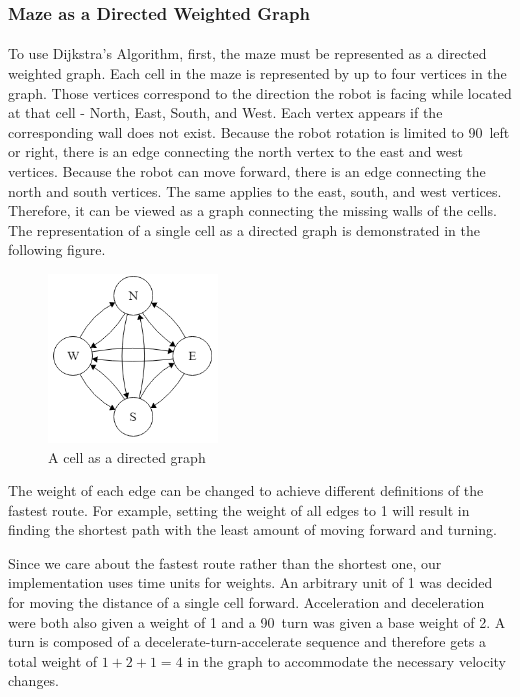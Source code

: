 \documentclass[12pt]{article}
\begin{document}
\subsubsection{Maze as a Directed Weighted Graph} \label{Maze as a Directed Weighted Graph}
\paragraph{}
To use Dijkstra's Algorithm, first, the \gls{maze} must be represented as a directed weighted \gls{graph}.
Each \gls{cell} in the \gls{maze} is represented by up to four vertices in the \gls{graph}.
Those vertices correspond to the direction the robot is facing while located at that \gls{cell} - North, East, South, and West.
Each vertex appears if the corresponding wall does not exist.
Because the robot rotation is limited to 90\textdegree\ left or right, there is an edge connecting the north vertex to the east and west vertices.
Because the robot can move forward, there is an edge connecting the north and south vertices.
The same applies to the east, south, and west vertices.
Therefore, it can be viewed as a \gls{graph} connecting the missing walls of the \gls{cell}s.
The representation of a single \gls{cell} as a directed \gls{graph} is demonstrated in the following figure.

\begin{figure}[H]
\centering
\includegraphics[width=0.4\textwidth]{images/cell_graph.png}
\caption{A \gls{cell} as a directed \gls{graph}}
\end{figure}

The weight of each edge can be changed to achieve different definitions of the fastest route.
For example, setting the weight of all edges to 1 will result in finding the shortest path with the least amount of moving forward and turning.

Since we care about the fastest route rather than the shortest one, our implementation uses time units for weights. An arbitrary unit of 1 was decided for moving the distance of a single cell forward. Acceleration and deceleration were both also given a weight of 1 and a 90\textdegree\ turn was given a base weight of 2. A turn is composed of a decelerate-turn-accelerate sequence and therefore gets a total weight of $1 + 2 + 1 = 4$ in the graph to accommodate the necessary velocity changes.
\end{document}
